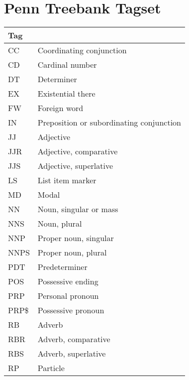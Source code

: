 \section{Penn Treebank Tagset}
\label{tab:penn}
\begin{table}[!htbp]
    \begin{tabular}{|l|l|}
    \hline
    Tag  & ~                                        \\ \hline
    CC   & Coordinating conjunction                 \\
    CD   & Cardinal number                          \\
    DT   & Determiner                               \\
    EX   & Existential there                        \\
    FW   & Foreign word                             \\
    IN   & Preposition or subordinating conjunction \\
    JJ   & Adjective                                \\
    JJR  & Adjective, comparative                   \\
    JJS  & Adjective, superlative                   \\
    LS   & List item marker                         \\
    MD   & Modal                                    \\
    NN   & Noun, singular or mass                   \\
    NNS  & Noun, plural                             \\
    NNP  & Proper noun, singular                    \\
    NNPS & Proper noun, plural                      \\
    PDT  & Predeterminer                            \\
    POS  & Possessive ending                        \\
    PRP  & Personal pronoun                         \\
    PRP\$ & Possessive pronoun                       \\
    RB   & Adverb                                   \\
    RBR  & Adverb, comparative                      \\
    RBS  & Adverb, superlative                      \\
    RP   & Particle                                 \\

\end{tabular}
\end{table}
